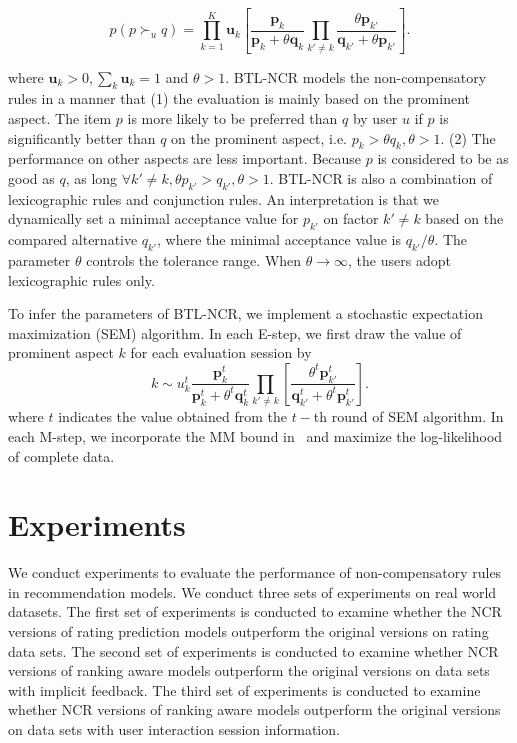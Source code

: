 \documentclass[letterpaper]{article} %
\begin{document}
\begin{equation}\label{equ:BTL-NCR}
p(p\succ_u q)  =  \prod_{k=1}^{K} \mathbf{u}_k [ {\frac{\mathbf{p}_k}{\mathbf{p}_k+\theta \mathbf{q}_k}}\prod_{k'\neq k}{ \frac{\theta \mathbf{p}_{k'}}{\mathbf{q}_{k'}+\theta \mathbf{p}_{k'}}}].
\end{equation}

where $\mathbf{u}_k >0, \sum_k \mathbf{u}_k=1$ and $\theta>1$.  BTL-NCR models the non-compensatory rules in a manner that (1) the evaluation is mainly based on the prominent aspect. The item $p$ is more likely to be preferred than $q$ by user $u$ if $p$ is significantly better than $q$ on the prominent aspect, i.e. $p_{k} > \theta q_{k}, \theta>1$. (2) The performance on other aspects are less  important. Because $p$ is considered to be as good as $q$, as long $\forall k'\neq k, \theta p_{k'} >  q_{k'}, \theta>1$.  BTL-NCR is also a combination of lexicographic rules and conjunction rules. An interpretation is that we dynamically set a minimal acceptance value for $p_{k'}$ on factor $k'\neq k$ based on the compared alternative $q_{k'}$, where the minimal acceptance value is $q_{k'}/\theta$.  The parameter $\theta$ controls the tolerance range. When $\theta \rightarrow \infty$, the users adopt lexicographic rules only.

To infer the parameters of BTL-NCR, we implement a stochastic expectation maximization (SEM) algorithm. In each E-step, we first draw the value of prominent aspect $k$ for each evaluation session by
 \begin{equation}
 k \sim u_k^{t} \frac{\mathbf{p}_{k}^t} {\mathbf{p}_{k}^t+\theta^t \mathbf{q}_{k}^t} \prod_{k'\neq k}  [\frac{\theta^t \mathbf{p}_{k'}^t} {\mathbf{q}_{k'}^t + \theta^t \mathbf{p}_{k'}^t}].
 \end{equation}
 where $t$ indicates the value obtained from the $t-$th round of SEM algorithm.
 In each M-step, we incorporate the MM bound in~\cite{Hunter2004MM} and maximize the log-likelihood of complete data. 




\section{Experiments}\label{sec:experiment}
We conduct experiments to evaluate the performance of non-compensatory rules in recommendation models. We conduct three sets of experiments on real world datasets. The first set of experiments is conducted to examine whether the NCR versions of rating prediction models outperform the original versions on rating data sets. 
The second set of experiments is conducted to examine whether NCR versions of ranking aware models outperform the original versions on data sets with implicit feedback.
The third set of experiments is conducted to examine whether NCR versions of ranking aware models outperform the original versions on data sets with user interaction session information.
\end{document}
